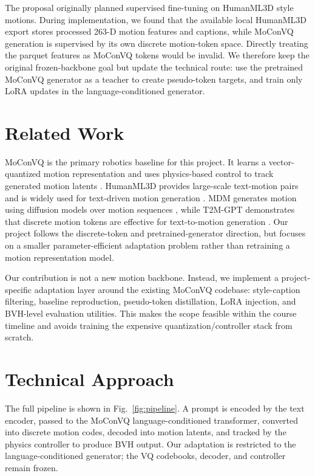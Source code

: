 \documentclass[conference]{IEEEtran}
\begin{document}
The proposal originally planned supervised fine-tuning on HumanML3D style motions. During implementation, we found that the available local HumanML3D export stores processed 263-D motion features and captions, while MoConVQ generation is supervised by its own discrete motion-token space. Directly treating the parquet features as MoConVQ tokens would be invalid. We therefore keep the original frozen-backbone goal but update the technical route: use the pretrained MoConVQ generator as a teacher to create pseudo-token targets, and train only LoRA updates in the language-conditioned generator.

\section{Related Work}
MoConVQ is the primary robotics baseline for this project. It learns a vector-quantized motion representation and uses physics-based control to track generated motion latents \cite{yao2024moconvq}. HumanML3D provides large-scale text-motion pairs and is widely used for text-driven motion generation \cite{guo2022humanml3d}. MDM generates motion using diffusion models over motion sequences \cite{tevet2023mdm}, while T2M-GPT demonstrates that discrete motion tokens are effective for text-to-motion generation \cite{zhang2023t2mgpt}. Our project follows the discrete-token and pretrained-generator direction, but focuses on a smaller parameter-efficient adaptation problem rather than retraining a motion representation model.

Our contribution is not a new motion backbone. Instead, we implement a project-specific adaptation layer around the existing MoConVQ codebase: style-caption filtering, baseline reproduction, pseudo-token distillation, LoRA injection, and BVH-level evaluation utilities. This makes the scope feasible within the course timeline and avoids training the expensive quantization/controller stack from scratch.

\section{Technical Approach}
The full pipeline is shown in Fig.~\ref{fig:pipeline}. A prompt is encoded by the text encoder, passed to the MoConVQ language-conditioned transformer, converted into discrete motion codes, decoded into motion latents, and tracked by the physics controller to produce BVH output. Our adaptation is restricted to the language-conditioned generator; the VQ codebooks, decoder, and controller remain frozen.
\end{document}
